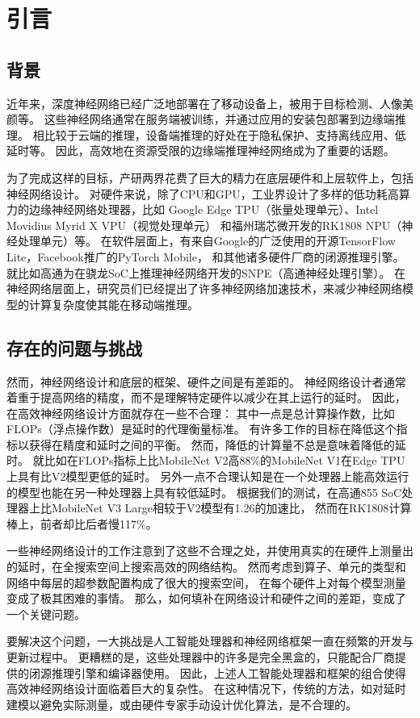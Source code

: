 \section{引言}
\subsection{背景}
近年来，深度神经网络已经广泛地部署在了移动设备上，被用于目标检测、人像美颜等。
这些神经网络通常在服务端被训练，并通过应用的安装包部署到边缘端推理。
相比较于云端的推理，设备端推理的好处在于隐私保护、支持离线应用、低延时等。
因此，高效地在资源受限的边缘端推理神经网络成为了重要的话题。

为了完成这样的目标，产研两界花费了巨大的精力在底层硬件和上层软件上，包括神经网络设计。
对硬件来说，除了CPU和GPU，工业界设计了多样的低功耗高算力的边缘神经网络处理器，比如
Google Edge TPU（张量处理单元）、Intel Movidius Myrid X VPU（视觉处理单元）
和福州瑞芯微开发的RK1808 NPU（神经处理单元）等。
在软件层面上，有来自Google的广泛使用的开源TensorFlow Lite，Facebook推广的PyTorch Mobile，
和其他诸多硬件厂商的闭源推理引擎。
就比如高通为在骁龙SoC上推理神经网络开发的SNPE（高通神经处理引擎）。
在神经网络层面上，研究员们已经提出了许多神经网络加速技术，来减少神经网络模型的计算复杂度使其能在移动端推理。

\subsection{存在的问题与挑战}
然而，神经网络设计和底层的框架、硬件之间是有差距的。
神经网络设计者通常着重于提高网络的精度，而不是理解特定硬件以减少在其上运行的延时。
因此，在高效神经网络设计方面就存在一些不合理：
其中一点是总计算操作数，比如FLOPs（浮点操作数）是延时的代理衡量标准。
有许多工作的目标在降低这个指标以获得在精度和延时之间的平衡。
然而，降低的计算量不总是意味着降低的延时。
就比如在FLOPs指标上比MobileNet V2高88\%的MobileNet V1在Edge TPU上具有比V2模型更低的延时。
另外一点不合理认知是在一个处理器上能高效运行的模型也能在另一种处理器上具有较低延时。
根据我们的测试，在高通855 SoC处理器上比MobileNet V3 Large相较于V2模型有1.26的加速比，
然而在RK1808计算棒上，前者却比后者慢117\%。

一些神经网络设计的工作注意到了这些不合理之处，并使用真实的在硬件上测量出的延时，在全搜索空间上搜索高效的网络结构。
然而考虑到算子、单元的类型和网络中每层的超参数配置构成了很大的搜索空间，
在每个硬件上对每个模型测量变成了极其困难的事情。
那么，如何填补在网络设计和硬件之间的差距，变成了一个关键问题。

要解决这个问题，一大挑战是人工智能处理器和神经网络框架一直在频繁的开发与更新过程中。
更糟糕的是，这些处理器中的许多是完全黑盒的，只能配合厂商提供的闭源推理引擎和编译器使用。
因此，上述人工智能处理器和框架的组合使得高效神经网络设计面临着巨大的复杂性。
在这种情况下，传统的方法，如对延时建模以避免实际测量，或由硬件专家手动设计优化算法，是不合理的。

